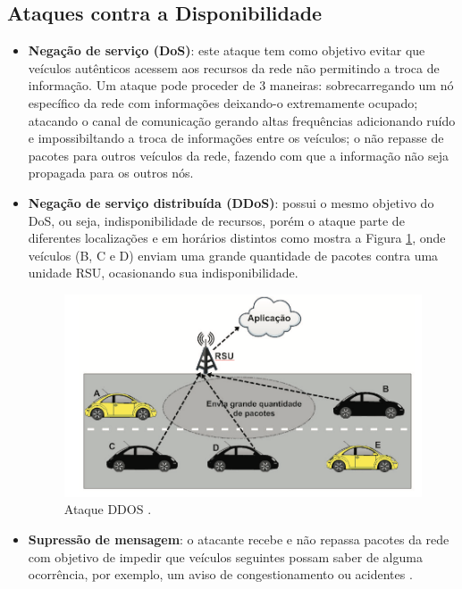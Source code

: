 \documentclass[
	12pt,				%
	oneside,			%
	a4paper,			%
	english,			%
	brazil				%
	]{abntex2ppgsi}
\begin{document}
\subsection{Ataques contra a Disponibilidade}
\begin{itemize}
	\item {\textbf{Negação de serviço (DoS)}: este ataque tem como objetivo evitar que veículos autênticos acessem aos recursos da rede não permitindo a troca de informação. Um ataque pode proceder de 3 maneiras: sobrecarregando um nó específico da rede com informações deixando-o extremamente ocupado; atacando o canal de comunicação gerando altas frequências adicionando ruído e impossibiltando a troca de informações entre os veículos; o não repasse de pacotes para outros veículos da rede, fazendo com que a informação não seja propagada para os outros nós}.
	
	\item {\textbf{Negação de serviço distribuída (DDoS)}: possui o mesmo objetivo do DoS, ou seja, indisponibilidade de recursos, porém o ataque parte de diferentes localizações e em horários distintos como mostra  a Figura \ref{fig:ataqueddos}, onde veículos (B, C e D) enviam uma grande quantidade de pacotes contra uma unidade RSU, ocasionando sua indisponibilidade.}

\begin{figure}[h!]
	\centering
	\includegraphics [width=12cm] {images/ataqueddos.png}
	\caption{Ataque DDOS \cite{wanghamsegurancca}.}
	\label{fig:ataqueddos}
\end{figure}
	
	\item {\textbf{Supressão de mensagem}: o atacante recebe e não repassa pacotes da rede com objetivo de impedir que veículos seguintes possam saber de alguma ocorrência, por exemplo, um aviso de congestionamento ou acidentes \cite{tangade2013survey}.}		


\end{itemize}
\end{document}
